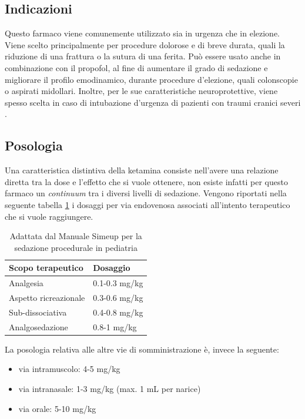 \subsection*{Indicazioni}

Questo farmaco viene comunemente utilizzato sia in urgenza che in elezione. Viene scelto principalmente per procedure dolorose e di breve durata, quali la riduzione di una frattura o la sutura di una ferita. Può essere usato anche in combinazione con il propofol, al fine di aumentare il grado di sedazione e migliorare il profilo emodinamico, durante procedure d'elezione, quali colonscopie o aspirati midollari. Inoltre, per le sue caratteristiche neuroprotettive, viene spesso scelta in caso di intubazione d'urgenza di pazienti con traumi cranici severi \cite{Simeupsedazione}.

\subsection*{Posologia}

Una caratteristica distintiva della ketamina consiste nell'avere una relazione diretta tra la dose e l'effetto che si vuole ottenere, non esiste infatti per questo farmaco un \emph{continuum} tra i diversi livelli di sedazione. Vengono riportati nella seguente tabella \ref{tab:1} i dosaggi per via endovenosa associati all'intento terapeutico che si vuole raggiungere.


\begin{table}[!h]
    \centering
    \begin{tabular}{|l|l|}
       Scopo terapeutico     & Dosaggio \\ \hline
       Analgesia & 0.1-0.3 mg/kg  \\
       Aspetto ricreazionale & 0.3-0.6 mg/kg \\
       Sub-dissociativa & 0.4-0.8 mg/kg \\
       Analgosedazione & 0.8-1 mg/kg 
    \end{tabular}
    \caption{Adattata dal Manuale Simeup per la sedazione procedurale in pediatria \cite{Simeupsedazione}}
    \label{tab:1}
\end{table}


La posologia relativa alle altre vie di somministrazione è, invece la seguente: 
\begin{itemize}
    \item via intramuscolo: 4-5 mg/kg
    \item via intranasale: 1-3 mg/kg (max. 1 mL per narice)
    \item via orale: 5-10 mg/kg
\end{itemize}

